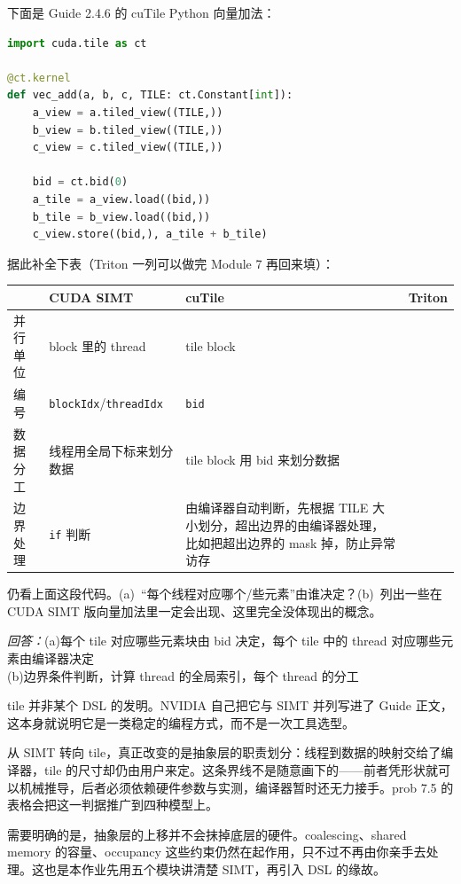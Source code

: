 \documentclass[11pt,a4paper,fontset=none]{ctexart}
\begin{document}
下面是 Guide 2.4.6 的 cuTile Python 向量加法：

\begin{lstlisting}[language=Python]
import cuda.tile as ct

@ct.kernel
def vec_add(a, b, c, TILE: ct.Constant[int]):
    a_view = a.tiled_view((TILE,))
    b_view = b.tiled_view((TILE,))
    c_view = c.tiled_view((TILE,))

    bid = ct.bid(0)
    a_tile = a_view.load((bid,))
    b_tile = b_view.load((bid,))
    c_view.store((bid,), a_tile + b_tile)
\end{lstlisting}

据此补全下表（Triton 一列可以做完 Module 7 再回来填）：

\begin{center}\small
\begin{tabular}{@{}lp{8em}p{9em}p{9em}@{}}
\toprule
 & CUDA SIMT & cuTile & Triton \\
\midrule
并行单位 & block 里的 thread & tile block & \\
编号 & \texttt{blockIdx}/\texttt{threadIdx} & \texttt{bid} & \\
数据分工 & 线程用全局下标来划分数据 & tile block 用 bid 来划分数据 & \\
边界处理 & \texttt{if} 判断 & 由编译器自动判断，先根据 TILE 大小划分，超出边界的由编译器处理，比如把超出边界的 mask 掉，防止异常访存 & \\
\bottomrule
\end{tabular}
\end{center}

仍看上面这段代码。(a)~“每个线程对应哪个/些元素”由谁决定？(b)~列出一些在 CUDA SIMT 版向量加法里一定会出现、这里完全没体现出的概念。
\par\noindent\textit{回答：}(a)每个 tile 对应哪些元素块由 bid 决定，每个 tile 中的 thread 对应哪些元素由编译器决定\\
(b)边界条件判断，计算 thread 的全局索引，每个 thread 的分工\\

\begin{lookback}
tile 并非某个 DSL 的发明。NVIDIA 自己把它与 SIMT 并列写进了 Guide 正文，这本身就说明它是一类稳定的编程方式，而不是一次工具选型。

从 SIMT 转向 tile，真正改变的是抽象层的职责划分：线程到数据的映射交给了编译器，tile 的尺寸却仍由用户来定。这条界线不是随意画下的——前者凭形状就可以机械推导，后者必须依赖硬件参数与实测，编译器暂时还无力接手。prob 7.5 的表格会把这一判据推广到四种模型上。

需要明确的是，抽象层的上移并不会抹掉底层的硬件。coalescing、shared memory 的容量、occupancy 这些约束仍然在起作用，只不过不再由你亲手去处理。这也是本作业先用五个模块讲清楚 SIMT，再引入 DSL 的缘故。
\end{lookback}
\end{document}
